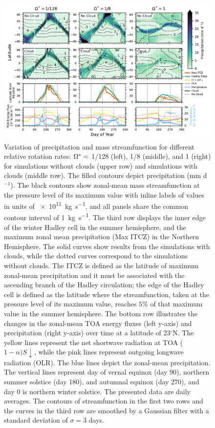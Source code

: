 \begin{figure}[htb]
   \centering
   \includegraphics[width=1\textwidth]{plots/5-ITCZ.pdf}
   \caption{Variation of precipitation and mass streamfunction for different relative rotation rates: $\Omega^*=$ 1/128 (left), 1/8 (middle), and 1 (right) for simulations without clouds (upper row) and simulations with clouds (middle row). The filled contours depict precipitation (mm d$^{-1}$). The black contours show zonal-mean mass streamfunction at the pressure level of its maximum value with inline labels of values in units of \SI{e11}{\kg\per\s}, and all panels share the common contour interval of \SI{1}{\kg\per\s}. The third row displays the inner edge of the winter Hadley cell in the summer hemisphere, and the maximum zonal mean precipitation (Max ITCZ) in the Northern Hemisphere. The solid curves show results from the simulations with clouds, while the dotted curves correspond to the simulations without clouds. The ITCZ is defined as the latitude of maximum zonal-mean precipitation and it must be associated with the ascending branch of the Hadley circulation; the edge of the Hadley cell is defined as the latitude where the streamfunction, taken at the pressure level of its maximum value, reaches $5\%$ of that maximum value in the summer hemisphere. The bottom row illustrates the changes in the zonal-mean TOA energy fluxes (left y-axis) and precipitation (right y-axis) over time at a latitude of 23$^\circ$N. The yellow lines represent the net shortwave radiation at TOA ($1-\alpha)S\downarrow$, while the pink lines represent outgoing longwave radiation (OLR). The blue lines depict the zonal-mean precipitation. The vertical lines represent day of vernal equinox (day 90), northern summer solstice (day 180), and autumnal equinox (day 270), and day 0 is northern winter solstice. The presented data are daily averages. The contours of streamfunction in the first two rows and the curves in the third row are smoothed by a Gaussian filter with a standard deviation of $\sigma = 3$ days.}
   \label{fig:ITCZ}
\end{figure}


